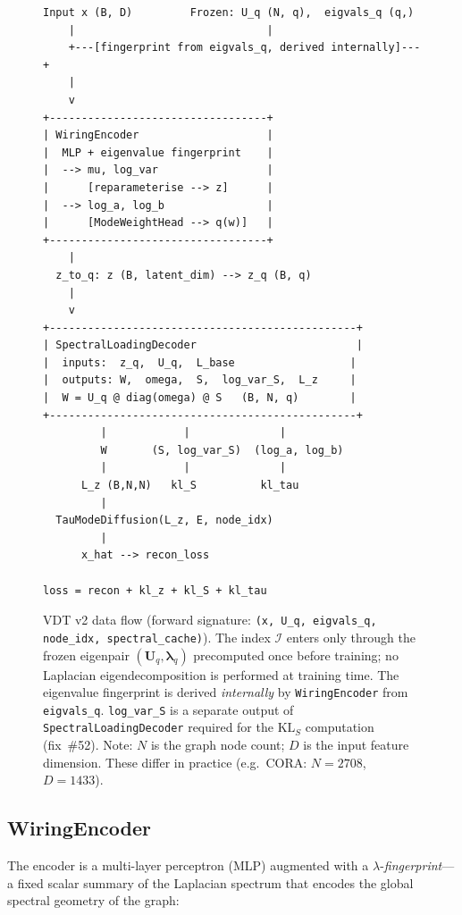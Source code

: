 \documentclass[11pt,a4paper]{article}
\newcommand{\Umat}{\mathbf{U}}
\begin{document}
\begin{figure}[H]
  \centering
  \begin{verbatim}
Input x (B, D)         Frozen: U_q (N, q),  eigvals_q (q,)
    |                              |
    +---[fingerprint from eigvals_q, derived internally]---+
    |
    v
+----------------------------------+
| WiringEncoder                    |
|  MLP + eigenvalue fingerprint    |
|  --> mu, log_var                 |
|      [reparameterise --> z]      |
|  --> log_a, log_b                |
|      [ModeWeightHead --> q(w)]   |
+----------------------------------+
    |
  z_to_q: z (B, latent_dim) --> z_q (B, q)
    |
    v
+------------------------------------------------+
| SpectralLoadingDecoder                         |
|  inputs:  z_q,  U_q,  L_base                  |
|  outputs: W,  omega,  S,  log_var_S,  L_z     |
|  W = U_q @ diag(omega) @ S   (B, N, q)        |
+------------------------------------------------+
         |            |              |
         W       (S, log_var_S)  (log_a, log_b)
         |            |              |
      L_z (B,N,N)   kl_S          kl_tau
         |
  TauModeDiffusion(L_z, E, node_idx)
         |
      x_hat --> recon_loss

loss = recon + kl_z + kl_S + kl_tau
  \end{verbatim}
  \caption{VDT v2 data flow (forward signature:
    \texttt{(x, U\_q, eigvals\_q, node\_idx, spectral\_cache)}).
    The index $\mathcal{I}$ enters only through the frozen eigenpair
    $(\Umat_q, \boldsymbol{\lambda}_q)$ precomputed once before training;
    no Laplacian eigendecomposition is performed at training time.
    The eigenvalue fingerprint is derived \emph{internally} by
    \texttt{WiringEncoder} from \texttt{eigvals\_q}.
    \texttt{log\_var\_S} is a separate output of
    \texttt{SpectralLoadingDecoder} required for the $\mathrm{KL}_S$
    computation (fix~\#52).
    Note: $N$ is the graph node count; $D$ is the input feature dimension.
    These differ in practice (e.g.\ CORA: $N{=}2708$, $D{=}1433$).}
  \label{fig:arch}
\end{figure}

\subsection{WiringEncoder}
\label{sec:architecture:encoder}

The encoder is a multi-layer perceptron (MLP) augmented with a
$\lambda$-\emph{fingerprint}---a fixed scalar summary of the Laplacian spectrum
that encodes the global spectral geometry of the graph:
\end{document}
